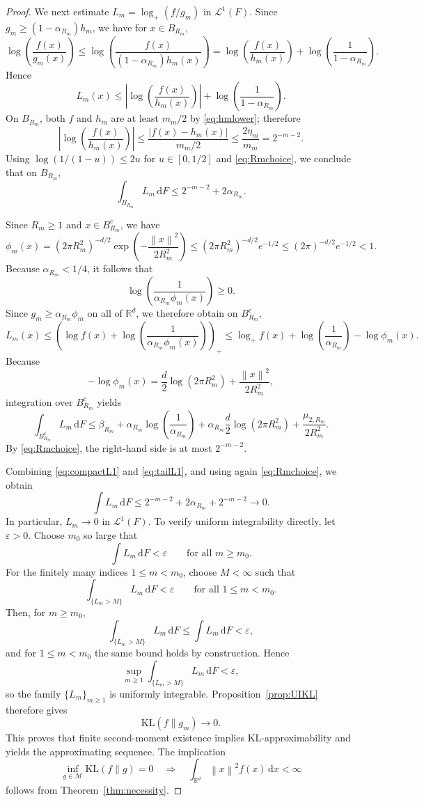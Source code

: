 \documentclass[11pt]{article}
\theoremstyle{definition}
\begin{document}
\begin{proof}
We next estimate $L_m=\log_+(f/g_m)$ in $\mathcal L^1(F)$. Since $g_m\ge (1-\alpha_{R_m})h_m$, we have for $x\in B_{R_m}$,
\[
\log\!\left(\frac{f(x)}{g_m(x)}\right)
\le \log\!\left(\frac{f(x)}{(1-\alpha_{R_m})h_m(x)}\right)
=\log\!\left(\frac{f(x)}{h_m(x)}\right)+\log\!\left(\frac1{1-\alpha_{R_m}}\right).
\]
Hence
\[
L_m(x)\le \left|\log\!\left(\frac{f(x)}{h_m(x)}\right)\right|+\log\!\left(\frac1{1-\alpha_{R_m}}\right).
\]
On $B_{R_m}$, both $f$ and $h_m$ are at least $m_m/2$ by \eqref{eq:hmlower}; therefore
\[
\left|\log\!\left(\frac{f(x)}{h_m(x)}\right)\right|
\le \frac{|f(x)-h_m(x)|}{m_m/2}
\le \frac{2\eta_m}{m_m}=2^{-m-2}.
\]
Using $\log(1/(1-u))\le 2u$ for $u\in[0,1/2]$ and \eqref{eq:Rmchoice}, we conclude that on $B_{R_m}$,
\begin{equation}
\label{eq:compactL1}
\int_{B_{R_m}}L_m\,\mathrm{d}F \le 2^{-m-2}+2\alpha_{R_m}.
\end{equation}

Since $R_m\ge1$ and $x\in B_{R_m}^c$, we have
\[
\phi_m(x)
=(2\pi R_m^2)^{-d/2}\exp\!\left(-\frac{\left\lVert x \right\rVert^2}{2R_m^2}\right)
\le (2\pi R_m^2)^{-d/2}e^{-1/2}
\le (2\pi)^{-d/2}e^{-1/2}<1.
\]
Because $\alpha_{R_m}<1/4$, it follows that
\[
\log\!\left(\frac{1}{\alpha_{R_m}\phi_m(x)}\right)\ge0.
\]
Since $g_m\ge \alpha_{R_m}\phi_m$ on all of $\mathbb{R}^d$, we therefore obtain on $B_{R_m}^c$,
\[
L_m(x)
\le \left(\log f(x)+\log\!\left(\frac1{\alpha_{R_m}\phi_m(x)}\right)\right)_+
\le \log_+ f(x)+\log\!\left(\frac1{\alpha_{R_m}}\right)-\log\phi_m(x).
\]
Because
\[
-\log\phi_m(x)=\frac d2\log(2\pi R_m^2)+\frac{\left\lVert x \right\rVert^2}{2R_m^2},
\]
integration over $B_{R_m}^c$ yields
\begin{equation}
\label{eq:tailL1}
\int_{B_{R_m}^c}L_m\,\mathrm{d}F
\le \beta_{R_m}+\alpha_{R_m}\log\!\left(\frac1{\alpha_{R_m}}\right)+\alpha_{R_m}\frac d2\log(2\pi R_m^2)+\frac{\mu_{2,R_m}}{2R_m^2}.
\end{equation}
By \eqref{eq:Rmchoice}, the right-hand side is at most $2^{-m-2}$.

Combining \eqref{eq:compactL1} and \eqref{eq:tailL1}, and using again \eqref{eq:Rmchoice}, we obtain
\[
\int L_m\,\mathrm{d}F \le 2^{-m-2}+2\alpha_{R_m}+2^{-m-2}\to0.
\]
In particular, $L_m\to0$ in $\mathcal L^1(F)$. To verify uniform integrability directly, let $\varepsilon>0$. Choose $m_0$ so large that
\[
\int L_m\,\mathrm{d}F<\varepsilon
\qquad\text{for all }m\ge m_0.
\]
For the finitely many indices $1\le m<m_0$, choose $M<\infty$ such that
\[
\int_{\{L_m>M\}}L_m\,\mathrm{d}F<\varepsilon
\qquad\text{for all }1\le m<m_0.
\]
Then, for $m\ge m_0$,
\[
\int_{\{L_m>M\}}L_m\,\mathrm{d}F\le \int L_m\,\mathrm{d}F<\varepsilon,
\]
and for $1\le m<m_0$ the same bound holds by construction. Hence
\[
\sup_{m\ge1}\int_{\{L_m>M\}}L_m\,\mathrm{d}F<\varepsilon,
\]
so the family $\{L_m\}_{m\ge1}$ is uniformly integrable. Proposition~\ref{prop:UIKL} therefore gives
\[
\mathrm{KL}(f\|g_m)\to0.
\]
This proves that finite second-moment existence implies KL-approximability and yields the approximating sequence. The implication
\[
\inf_{g\in\mathcal M}\mathrm{KL}(f\|g)=0
\quad\Longrightarrow\quad
\int_{\mathbb{R}^d}\left\lVert x \right\rVert^2f(x)\,\mathrm{d}x<\infty
\]
follows from Theorem~\ref{thm:necessity}.
\end{proof}
\end{document}
